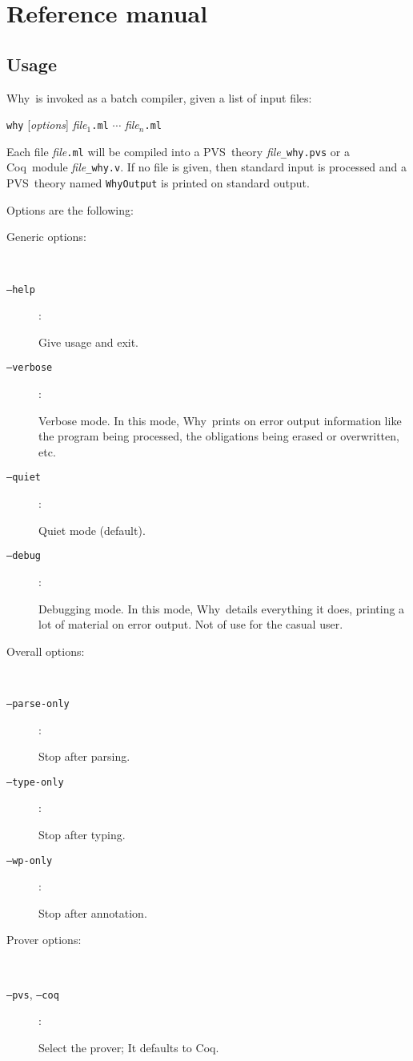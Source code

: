 \documentclass[a4paper,12pt]{report}
\newcommand{\pvs}{\textsf{PVS}}
\newcommand{\coq}{\textsf{Coq}}
\newcommand{\why}{\textsf{Why}}
\begin{document}
\chapter{Reference manual}
\label{refman}

\section{Usage}
\label{usage}

\why\ is invoked as a batch compiler, given a list of input files:
\begin{center}
  \texttt{why} [\textit{options}] \textit{file}$_1$\texttt{.ml} $\cdots$
    \textit{file}$_n$\texttt{.ml}
\end{center}
Each file \textit{file}\texttt{.ml} will be compiled into a \pvs\ theory
\textit{file}\texttt{\_why.pvs} or a \coq\ module
\textit{file}\texttt{\_why.v}.
If no file is given, then standard input is processed and a \pvs\ theory
named \texttt{WhyOutput} is printed on standard output.

Options are the following:
\begin{description}
  \item[Generic options:] ~\par
  \item[\texttt{--help}]: ~\par    
    Give usage and exit. 
  \item[\texttt{--verbose}]: ~\par 
    Verbose mode. In this mode, \why\ prints on error output
    information like the program being processed, the obligations
    being erased or overwritten, etc.
  \item[\texttt{--quiet}]: ~\par  
    Quiet mode (default).
  \item[\texttt{--debug}]: ~\par 
    Debugging mode. In this mode, \why\ details everything it does,
    printing a lot of material on error output. Not of use for the
    casual user.

  \item[Overall options:] ~\par
  \item[\texttt{--parse-only}]: ~\par  
    Stop after parsing.
  \item[\texttt{--type-only}]:  ~\par  
    Stop after typing.
  \item[\texttt{--wp-only}]:    ~\par  
    Stop after annotation.

  \item[Prover options:] ~\par
  \item[\texttt{--pvs}, \texttt{--coq}]: ~\par 
    Select the prover; It defaults to \coq.
\end{description}
\end{document}
